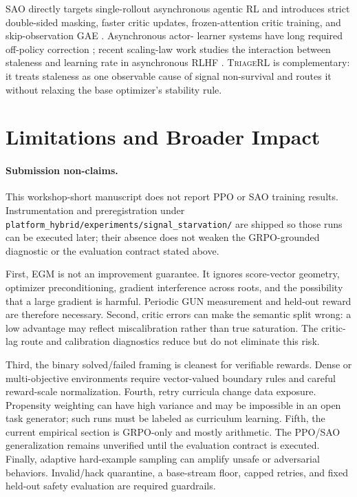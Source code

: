 \documentclass{article}
\newcommand{\method}{\textsc{TriageRL}\xspace}
\begin{document}
SAO directly targets single-rollout asynchronous agentic RL and introduces
strict double-sided masking, faster critic updates, frozen-attention critic
training, and skip-observation GAE \citep{hou2026sao}.  Asynchronous actor-
learner systems have long required off-policy correction
\citep{mnih2016asynchronous,espeholt2018impala}; recent scaling-law work studies
the interaction between staleness and learning rate in asynchronous RLHF
\citep{song2026staleness}.  \method is complementary: it treats staleness as
one observable cause of signal non-survival and routes it without relaxing the
base optimizer's stability rule.

\section{Limitations and Broader Impact}

\paragraph{Submission non-claims.}
This workshop-short manuscript does not report PPO or SAO training results.
Instrumentation and preregistration under
\texttt{platform\_hybrid/experiments/signal\_starvation/} are shipped so those
runs can be executed later; their absence does not weaken the GRPO-grounded
diagnostic or the evaluation contract stated above.

First, EGM is not an improvement guarantee.  It ignores score-vector geometry,
optimizer preconditioning, gradient interference across roots, and the
possibility that a large gradient is harmful.  Periodic GUN measurement and
held-out reward are therefore necessary.  Second, critic errors can make the
semantic split wrong: a low advantage may reflect miscalibration rather than
true saturation.  The critic-lag route and calibration diagnostics reduce but
do not eliminate this risk.

Third, the binary solved/failed framing is cleanest for verifiable rewards.
Dense or multi-objective environments require vector-valued boundary rules and
careful reward-scale normalization.  Fourth, retry curricula change data
exposure.  Propensity weighting can have high variance and may be impossible
in an open task generator; such runs must be labeled as curriculum learning.
Fifth, the current empirical section is GRPO-only and mostly arithmetic.  The
PPO/SAO generalization remains unverified until the evaluation contract is
executed.  Finally, adaptive hard-example sampling can amplify unsafe or
adversarial behaviors.  Invalid/hack quarantine, a base-stream floor, capped
retries, and fixed held-out safety evaluation are required guardrails.
\end{document}
